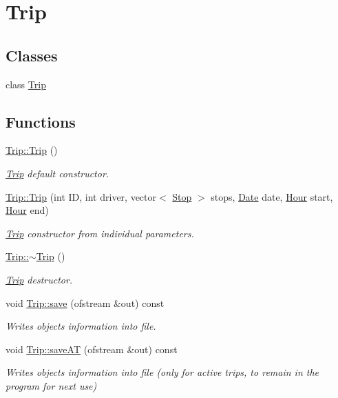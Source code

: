 \hypertarget{group___trip}{}\section{Trip}
\label{group___trip}
\subsection*{Classes}
\begin{DoxyCompactItemize}
\item 
class \hyperlink{class_trip}{Trip}
\end{DoxyCompactItemize}
\subsection*{Functions}
\begin{DoxyCompactItemize}
\item 
\mbox{\label{group___trip_gaa67b77d0d2de622ed5eb9e9cad34db8f}} 
\hyperlink{group___trip_gaa67b77d0d2de622ed5eb9e9cad34db8f}{Trip\+::\+Trip} ()
\begin{DoxyCompactList}\small\item\em \hyperlink{class_trip}{Trip} default constructor. \end{DoxyCompactList}\item 
\hyperlink{group___trip_gaadf8ba70a9d5aa210149b5162e402512}{Trip\+::\+Trip} (int ID, int driver, vector$<$ \hyperlink{class_stop}{Stop} $>$ stops, \hyperlink{class_date}{Date} date, \hyperlink{class_hour}{Hour} start, \hyperlink{class_hour}{Hour} end)
\begin{DoxyCompactList}\small\item\em \hyperlink{class_trip}{Trip} constructor from individual parameters. \end{DoxyCompactList}\item 
\mbox{\label{group___trip_ga2376daed3b03469163782ef0d0533d52}} 
\hyperlink{group___trip_ga2376daed3b03469163782ef0d0533d52}{Trip\+::$\sim$\+Trip} ()
\begin{DoxyCompactList}\small\item\em \hyperlink{class_trip}{Trip} destructor. \end{DoxyCompactList}\item 
void \hyperlink{group___trip_ga6ae6134652b644fa63bf267b956f1e75}{Trip\+::save} (ofstream \&out) const
\begin{DoxyCompactList}\small\item\em Writes object\textquotesingle{}s information into file. \end{DoxyCompactList}\item 
void \hyperlink{group___trip_gafcf569c0a9d6e5a47134f7e9dd62334a}{Trip\+::save\+AT} (ofstream \&out) const
\begin{DoxyCompactList}\small\item\em Writes object\textquotesingle{}s information into file (only for active trips, to remain in the program for next use) \end{DoxyCompactList}\end{DoxyCompactItemize}

